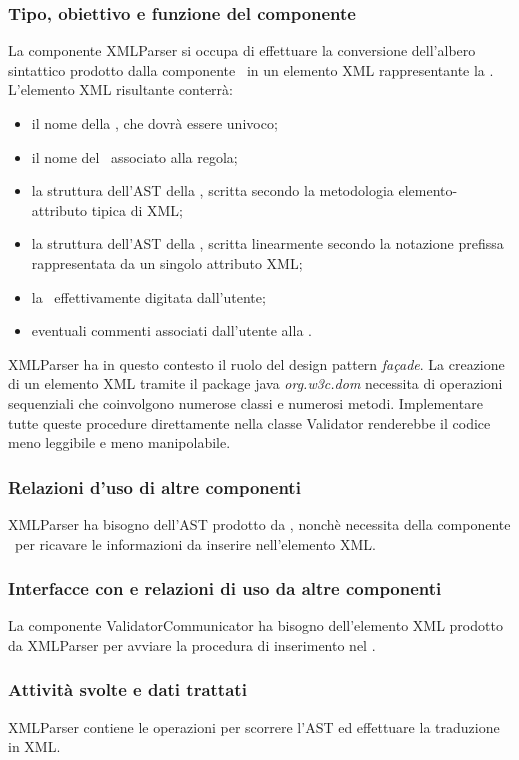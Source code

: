\subsubsection{Tipo, obiettivo e funzione del componente}
La componente XMLParser si occupa di effettuare la conversione dell'albero sintattico prodotto dalla componente \brp\ in un elemento XML rappresentante la \br. L'elemento XML risultante conterr\`a:
\begin{itemize}
 \item il nome della \br, che dovr\`a essere univoco;
 \item il nome del \bo\ associato alla regola;
 \item la struttura dell'AST della \br, scritta secondo la metodologia elemento-attributo tipica di XML;
 \item la struttura dell'AST della \br, scritta linearmente secondo la notazione prefissa rappresentata da un singolo attributo XML;
 \item la \br\ effettivamente digitata dall'utente;
 \item eventuali commenti associati dall'utente alla \br.
\end{itemize}
XMLParser ha in questo contesto il ruolo del design pattern \textit{fa\c{c}ade}. La creazione di un elemento XML tramite il package java \textit{org.w3c.dom} necessita di operazioni sequenziali che coinvolgono numerose classi e numerosi metodi. Implementare tutte queste procedure direttamente nella classe Validator renderebbe il codice meno leggibile e meno manipolabile.
\subsubsection{Relazioni d'uso di altre componenti}
XMLParser ha bisogno dell'AST prodotto da \brp, nonch\`e necessita della componente \br\ per ricavare le informazioni da inserire nell'elemento XML.
\subsubsection{Interfacce con e relazioni di uso da altre componenti}
La componente ValidatorCommunicator ha bisogno dell'elemento XML prodotto da XMLParser per avviare la procedura di inserimento nel \rp.
\subsubsection{Attivit\`a svolte e dati trattati}
XMLParser contiene le operazioni per scorrere l'AST ed effettuare la traduzione in XML.

